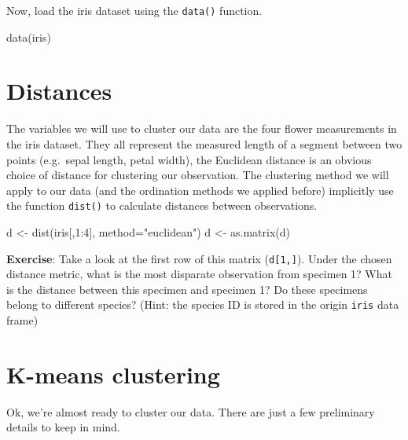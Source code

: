 \documentclass[
]{book}
\newenvironment{Shaded}{\begin{snugshade}}{\end{snugshade}}
\newcommand{\AttributeTok}[1]{\textcolor[rgb]{0.77,0.63,0.00}{#1}}
\newcommand{\DecValTok}[1]{\textcolor[rgb]{0.00,0.00,0.81}{#1}}
\newcommand{\FunctionTok}[1]{\textcolor[rgb]{0.00,0.00,0.00}{#1}}
\newcommand{\NormalTok}[1]{#1}
\newcommand{\OtherTok}[1]{\textcolor[rgb]{0.56,0.35,0.01}{#1}}
\newcommand{\SpecialCharTok}[1]{\textcolor[rgb]{0.00,0.00,0.00}{#1}}
\newcommand{\StringTok}[1]{\textcolor[rgb]{0.31,0.60,0.02}{#1}}
\begin{document}
Now, load the iris dataset using the \texttt{data()} function.

\begin{Shaded}
\begin{Highlighting}[]
\FunctionTok{data}\NormalTok{(iris)}
\end{Highlighting}
\end{Shaded}

\hypertarget{distances}{%
\section{Distances}\label{distances}}

The variables we will use to cluster our data are the four flower measurements in the iris dataset. They all represent the measured length of a segment between two points (e.g.~sepal length, petal width), the Euclidean distance is an obvious choice of distance for clustering our observation. The clustering method we will apply to our data (and the ordination methods we applied before) implicitly use the function \texttt{dist()} to calculate distances between observations.

\begin{Shaded}
\begin{Highlighting}[]
\NormalTok{d }\OtherTok{\textless{}{-}} \FunctionTok{dist}\NormalTok{(iris[,}\DecValTok{1}\SpecialCharTok{:}\DecValTok{4}\NormalTok{], }\AttributeTok{method=}\StringTok{"euclidean"}\NormalTok{)}
\NormalTok{d }\OtherTok{\textless{}{-}} \FunctionTok{as.matrix}\NormalTok{(d)}
\end{Highlighting}
\end{Shaded}

\textbf{Exercise}: Take a look at the first row of this matrix (\texttt{d{[}1,{]}}). Under the chosen distance metric, what is the most disparate observation from specimen 1? What is the distance between this specimen and specimen 1? Do these specimens belong to different species? (Hint: the species ID is stored in the origin \texttt{iris} data frame)

\hypertarget{k-means-clustering}{%
\section{K-means clustering}\label{k-means-clustering}}

Ok, we're almost ready to cluster our data. There are just a few preliminary details to keep in mind.
\end{document}
